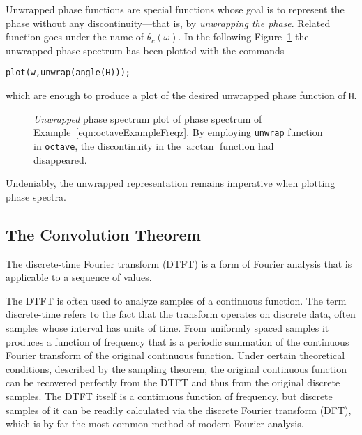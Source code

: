 \documentclass[\documentfontsize, twocolumn]{\classname}
\begin{document}
Unwrapped phase functions are special functions whose goal is to represent the phase without any dis\-con\-ti\-nui\-ty---that is, by \emph{unwrapping the phase}. Related function goes under the name of $\theta_c(\omega)$. In the following Figure~\ref{oct:octaveExampleFreqzUnwrap} the unwrapped phase spectrum has been plotted with the commands
\begin{verbatim}
plot(w,unwrap(angle(H)));
\end{verbatim}
which are enough to produce a plot of the desired unwrapped phase function of \texttt{H}.

\begin{figure}[ht]
    \begin{center}
\scalebox{0.6}{

}\caption{\emph{Unwrapped} phase spectrum plot of phase spectrum of Example~\ref{eqn:octaveExampleFreqz}. By employing \texttt{unwrap} function in \texttt{octave}, the discontinuity in the $\arctan{}$ function had disappeared.}\label{oct:octaveExampleFreqzUnwrap}
    \end{center}
\end{figure}
Undeniably, the unwrapped representation remains imperative when plotting phase spectra.

\subsection{The Convolution Theorem}\label{sec:convolutionTheorem}

The discrete-time Fourier transform (DTFT) is a form of Fourier analysis that is applicable to a sequence of values.

The DTFT is often used to analyze samples of a continuous function. The term discrete-time refers to the fact that the transform operates on discrete data, often samples whose interval has units of time. From uniformly spaced samples it produces a function of frequency that is a periodic summation of the continuous Fourier transform of the original continuous function. Under certain theoretical conditions, described by the sampling theorem, the original continuous function can be recovered perfectly from the DTFT and thus from the original discrete samples. The DTFT itself is a continuous function of frequency, but discrete samples of it can be readily calculated via the discrete Fourier transform (DFT), which is by far the most common method of modern Fourier analysis.
\end{document}
